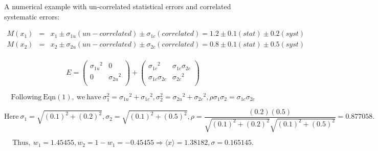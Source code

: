 \documentclass[12pt,a4paper,dvips]{article}
\newcommand{\sai}        {\ensuremath{\sigma_{1u}}}
\newcommand{\sbi}        {\ensuremath{\sigma_{2u}}}
\newcommand{\saj}        {\ensuremath{\sigma_{1c}}}
\newcommand{\sbj}        {\ensuremath{\sigma_{2c}}}
\begin{document}
A numerical example with un-correlated statistical errors and correlated systematic errors:

\vspace*{-1cm}

\begin{eqnarray*}
M(x_1) &=& x_1 \pm \sai (un-correlated) \pm \saj (correlated) = 1.2 \pm 0.1 (stat) \pm 0.2 (syst)\\
M(x_2) &=& x_2 \pm \sbi (un-correlated) \pm \sbj (correlated) = 0.8 \pm 0.1 (stat) \pm 0.5 (syst)\\
\end{eqnarray*}

\vspace*{-1.5cm}

\begin{equation}
E 
 =
\left( {\begin{array}{cc}
 \sai^2 & 0       \\
 0      & \sbi^2  \\
 \end{array} } \right)
+
\left( {\begin{array}{cc}
 \saj^2   & \saj\sbj  \\
 \saj\sbj & \sbj^2  \\
 \end{array} } \right)
\end{equation}

\vspace*{-.5cm}

\begin{equation}
\mathrm{Following~Eqn (1),~we~have~}
\sigma_1^2 = \sai^2 + \saj^2,
\sigma_2^2 = \sbi^2 + \sbj^2,
\rho\sigma_1\sigma_2 = \saj\sbj
\end{equation}

\vspace*{-.5cm}

$$\mathrm{Here~} 
\sigma_1 = \sqrt{(0.1)^2 + (0.2)^2}, 
\sigma_2 = \sqrt{(0.1)^2 + (0.5)^2}, 
\rho = \frac{(0.2)(0.5)}{\sqrt{(0.1)^2+(0.2)^2}\sqrt{(0.1)^2+(0.5)^2}} = 0.877058.$$


\vspace*{-.5cm}

$$\mathrm{Thus,~} w_1 = 1.45455, w_2 = 1 - w_1 = -0.45455 
\Rightarrow 
\langle x \rangle = 1.38182, 
\sigma = 0.165145.$$

\end{document}
